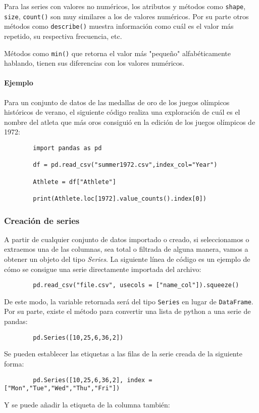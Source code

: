 Para las series con valores no numéricos, los atributos y métodos como
\texttt{shape}, \texttt{size}, \texttt{count()} son muy similares a los de
valores numéricos. Por su parte otros métodos como \texttt{describe()} muestra
información como cuál es el valor más repetido, su respectiva frecuencia, etc.

Métodos como \texttt{min()} que retorna el valor más "pequeño" alfabéticamente
hablando, tienen sus diferencias con los valores numéricos.

\paragraph{Ejemplo} Para un conjunto de datos de las medallas de oro de los
juegos olímpicos históricos de verano, el siguiente código realiza una
exploración de cuál es el nombre del atleta que más oros consiguió en la
edición de los juegos olímpicos de 1972:

\begin{verbatim}
        import pandas as pd
        
        df = pd.read_csv("summer1972.csv",index_col="Year")
        
        Athlete = df["Athlete"]
        
        print(Athlete.loc[1972].value_counts().index[0])
        \end{verbatim}
\subsubsection{Creación de series}

A partir de cualquier conjunto de datos importado o creado, si seleccionamos o
extraemos una de las columnas, sea total o filtrada de alguna manera, vamos a
obtener un objeto del tipo \textit{Series}.
La siguiente línea de código es un ejemplo de cómo se consigue una serie
directamente importada del archivo:

\begin{verbatim}
        pd.read_csv("file.csv", usecols = ["name_col"]).squeeze()
        \end{verbatim}
De este modo, la variable retornada será del tipo \texttt{Series} en lugar de
\texttt{DataFrame}.
Por su parte, existe el método para convertir una lista de python a una serie
de pandas:

\begin{verbatim}
        pd.Series([10,25,6,36,2])
        \end{verbatim}
Se pueden establecer las etiquetas a las filas de la serie creada de la
siguiente forma:
\begin{verbatim}
        pd.Series([10,25,6,36,2], index = ["Mon","Tue","Wed","Thu","Fri"])
        \end{verbatim}
Y se puede añadir la etiqueta de la columna también:

